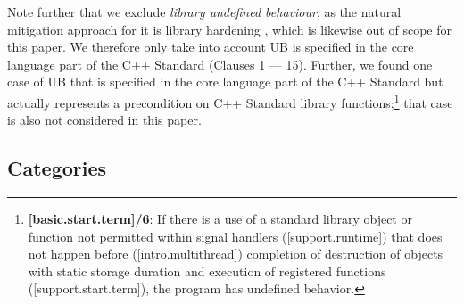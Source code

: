 Note further that we exclude \emph{library undefined behaviour}, as the natural mitigation approach for it is library hardening \cite{P3471R4}, which is likewise out of scope for this paper. We therefore only take into account UB is specified in the core language part of the C++ Standard (Clauses 1 --- 15). Further, we found one case of UB that is specified in the core language part of the C++ Standard but actually represents a precondition on C++ Standard library functions;\footnote{\textbf{[basic.start.term]/6}: If there is a use of a standard library object or function not permitted within signal handlers ([support.runtime]) that does not happen before ([intro.multithread]) completion of destruction of objects with static storage duration and execution of  registered functions ([support.start.term]), the program has undefined behavior.}
that case is also not considered in this paper.

\subsection{Categories}


